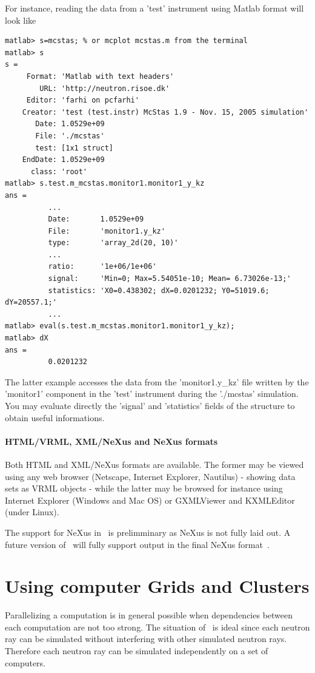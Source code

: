 For instance, reading the data from a 'test' instrument using Matlab format will look like
\begin{verbatim}
matlab> s=mcstas; % or mcplot mcstas.m from the terminal
matlab> s
s =
     Format: 'Matlab with text headers'
        URL: 'http://neutron.risoe.dk'
     Editor: 'farhi on pcfarhi'
    Creator: 'test (test.instr) McStas 1.9 - Nov. 15, 2005 simulation'
       Date: 1.0529e+09
       File: './mcstas'
       test: [1x1 struct]
    EndDate: 1.0529e+09
      class: 'root'
matlab> s.test.m_mcstas.monitor1.monitor1_y_kz
ans =
          ...
          Date:       1.0529e+09
          File:       'monitor1.y_kz'
          type:       'array_2d(20, 10)'
          ...
          ratio:      '1e+06/1e+06'
          signal:     'Min=0; Max=5.54051e-10; Mean= 6.73026e-13;'
          statistics: 'X0=0.438302; dX=0.0201232; Y0=51019.6; dY=20557.1;'
          ...
matlab> eval(s.test.m_mcstas.monitor1.monitor1_y_kz);
matlab> dX
ans =
          0.0201232
\end{verbatim}
The latter example accesses the data from the 'monitor1.y\_kz' file written by the 'monitor1' component in the 'test' instrument during the './mcstas' simulation. You may evaluate directly the 'signal' and 'statistics' fields of the structure to obtain useful informations.

\paragraph{HTML/VRML, XML/NeXus and NeXus formats}

Both HTML and XML/NeXus formats are available. The former may be viewed using any web browser (Netscape, Internet Explorer, Nautilus) - showing data sets as VRML objects - while the latter may be browsed for instance using Internet Explorer (Windows and Mac OS) or GXMLViewer and KXMLEditor (under Linux).

The support for NeXus in \MCS\ is prelimminary as NeXus is not fully
laid out. A future version of \MCS\ will fully support output in the
final NeXus format~\cite{nexus_webpage}.

\section{Using computer Grids and Clusters}
\label{s:run-mpi}

Parallelizing a computation is in general possible when dependencies between
  each computation are not too strong. The situation of \MCS\ is
  ideal since each neutron ray can be simulated without interfering with
  other simulated neutron rays. Therefore each neutron ray can be simulated
  independently on a set of computers.

